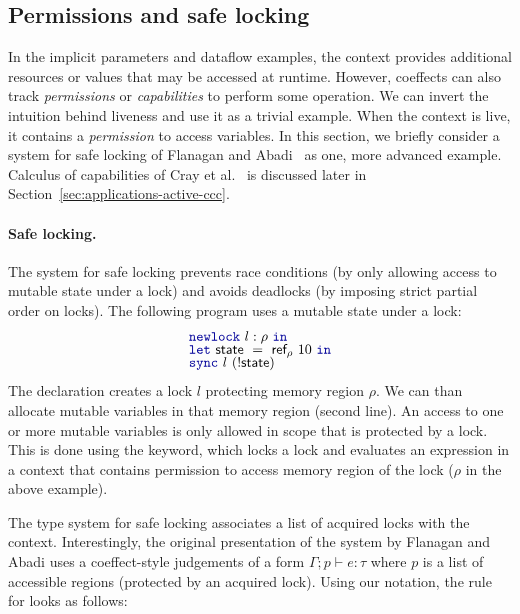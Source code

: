 \subsection{Permissions and safe locking}
In the implicit parameters and dataflow examples, the context provides additional resources or
values that may be accessed at runtime. However, coeffects can also track \emph{permissions} or
\emph{capabilities} to perform some operation. We can invert the intuition behind liveness and
use it as a trivial example. When the context is live, it contains a \emph{permission} to access
variables. In this section, we briefly consider a system for safe locking of Flanagan and
Abadi~\cite{app-safe-locking} as one, more advanced example. Calculus of capabilities of
Cray et al.~\cite{app-capabilities} is discussed later in Section~\ref{sec:applications-active-ccc}.

\paragraph{Safe locking.}
The system for safe locking prevents race conditions (by only allowing access to mutable state
under a lock) and avoids deadlocks (by imposing strict partial order on locks). The following
program uses a mutable state under a lock:
%
\begin{equation*}
\begin{array}{l}
\kvd{newlock}~l:\rho~\kvd{in}\\[-0.25em]
\kvd{let}~\ident{state}~=~\ident{ref}_\rho~10~\kvd{in}\\[-0.25em]
\kvd{sync}~l~(!\ident{state})
\end{array}
\end{equation*}
%
The declaration  creates a lock $l$ protecting memory region $\rho$. We can than
allocate mutable variables in that memory region (second line). An access to one or more mutable
variables is only allowed in scope that is protected by a lock. This is done using the  keyword,
which locks a lock and evaluates an expression in a context that contains permission to access
memory region of the lock ($\rho$ in the above example).

The type system for safe locking associates a list of acquired locks with the context.
Interestingly, the original presentation of the system by Flanagan and Abadi \cite{app-safe-locking}
uses a coeffect-style judgements of a form $\Gamma; p \vdash e : \tau$ where $p$ is a list of
accessible regions (protected by an acquired lock). Using our notation, the rule for 
looks as follows:


